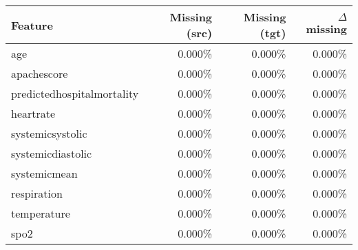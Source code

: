 \begin{tabular}{lrrr}
\toprule
Feature & Missing (src) & Missing (tgt) & $\Delta$ missing \\
\midrule
age & 0.000\% & 0.000\% & 0.000\% \\
apachescore & 0.000\% & 0.000\% & 0.000\% \\
predictedhospitalmortality & 0.000\% & 0.000\% & 0.000\% \\
heartrate & 0.000\% & 0.000\% & 0.000\% \\
systemicsystolic & 0.000\% & 0.000\% & 0.000\% \\
systemicdiastolic & 0.000\% & 0.000\% & 0.000\% \\
systemicmean & 0.000\% & 0.000\% & 0.000\% \\
respiration & 0.000\% & 0.000\% & 0.000\% \\
temperature & 0.000\% & 0.000\% & 0.000\% \\
spo2 & 0.000\% & 0.000\% & 0.000\% \\
\bottomrule
\end{tabular}
